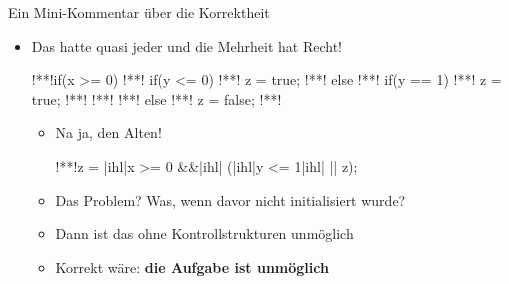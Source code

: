 \begin{frame}[fragile]{Ein Mini-Kommentar über die Korrektheit}
\begin{itemize}
    \item<2-> Das hatte quasi jeder und die Mehrheit hat Recht!\vspace*{-2.33mm}
\columns[onlytextwidth,c]
\begin{plainjava}
!**!if(x >= 0){
!**!    if(y <= 0) {
!**!        z = true;
!**!    } else {
!**!        if(y == 1) {
!**!            z = true;
!**!        }
!**!    }
!**!} else {
!**!    z = false;
!**!}
\end{plainjava}
\begin{itemize}
    \item<5-> Na ja, den Alten!\SetupLstHl
\begin{plainjava}
!**!z = |ihl|x >= 0 &&|ihl| (|ihl|y <= 1|ihl| || z);
\end{plainjava}
    \item<7-> Das Problem? Was, wenn  davor nicht initialisiert wurde?
    \item<8-> Dann ist das ohne Kontrollstrukturen unmöglich
    \item<10-> Korrekt wäre: \textbf{die Aufgabe ist  unmöglich}
\end{itemize}
\endcolumns
\end{itemize}
\end{frame}
\iffull
\begin{frame}[c]{}
\centering{}
\\
\end{frame}
\dmfoottrue
\fi


